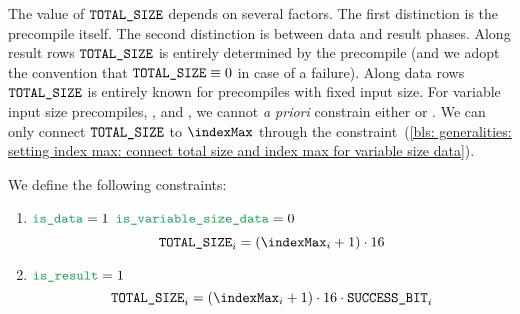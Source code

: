 The value of $\texttt{TOTAL\_SIZE}$ depends on several factors.
The first distinction is the precompile itself.
The second distinction is between data and result phases.
Along result rows $\texttt{TOTAL\_SIZE}$ is entirely determined by the precompile (and we adopt the convention that $\texttt{TOTAL\_SIZE} \equiv 0$ in case of a failure).
Along data rows $\texttt{TOTAL\_SIZE}$ is entirely known for precompiles with fixed input size.
For variable input size precompiles, \instBlsGOneMsm{}, \instBlsGTwoMsm{} and \instBlsPairingCheck{}, we cannot \emph{a priori} constrain either \blsTotalSize{} or \indexMax{}.
We can only connect $\texttt{TOTAL\_SIZE}$ to $\indexMax$ through the constraint~(\ref{bls: generalities: setting index max: connect total size and index max for variable size data}).

We define the following constraints:
\begin{enumerate}
  \item \If $\locIsData = 1$ \et $\locIsVariableSizeData = 0$ \Then
    \[
        \blsTotalSize _{i} = (\indexMax _{i} + 1) \cdot 16
    \]
  \item \If $\locIsResult = 1$ \Then
    \[
        \blsTotalSize _{i} = (\indexMax _{i} + 1) \cdot 16 \cdot \blsSuccessBit _{i}
    \]
\end{enumerate}